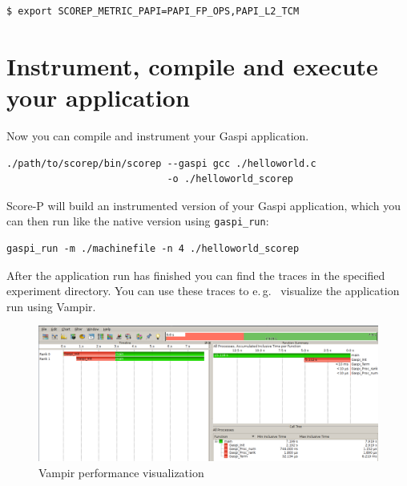 \documentclass[plainarticle,german,final,hyperref,utf8]{article}
\newcommand{\GASPI}{{\sc Gaspi}}
\newcommand{\SCOREP}{{Score-P}}
\newcommand{\eg}{e.\,g.\ }
\begin{document}
\begin{lstlisting}
$ export SCOREP_METRIC_PAPI=PAPI_FP_OPS,PAPI_L2_TCM
\end{lstlisting}



\section*{Instrument, compile and execute your application}

Now you can compile and instrument your \GASPI{} application. 

\begin{lstlisting}
./path/to/scorep/bin/scorep --gaspi gcc ./helloworld.c 
                            -o ./helloworld_scorep
\end{lstlisting}

\SCOREP{} will build an instrumented version of your \GASPI{} application, which you can then run like the native version using {\tt gaspi\_run}:

\begin{lstlisting}
gaspi_run -m ./machinefile -n 4 ./helloworld_scorep
\end{lstlisting}

After the application run has finished you can find the traces in the specified experiment directory.
You can use these traces to \eg{} visualize the application run using Vampir.
\begin{figure}[hb]
\centering
\includegraphics[width=\textwidth]{./trace_all.png}
\caption{Vampir performance visualization}
\end{figure}
\end{document}
